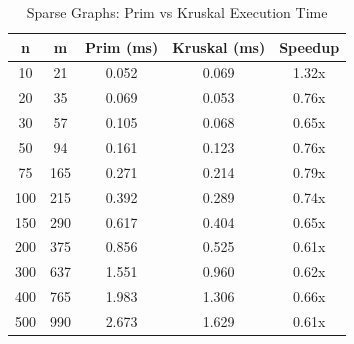 \begin{table}[H]
    \centering
    \small
    \begin{tabular}{|c|c|c|c|c|}
    \hline
    \textbf{n} & \textbf{m} & \textbf{Prim (ms)} & \textbf{Kruskal (ms)} & \textbf{Speedup} \\
    \hline
     10 &    21 &   0.052 &   0.069 &  1.32x \\
     20 &    35 &   0.069 &   0.053 &  0.76x \\
     30 &    57 &   0.105 &   0.068 &  0.65x \\
     50 &    94 &   0.161 &   0.123 &  0.76x \\
     75 &   165 &   0.271 &   0.214 &  0.79x \\
    100 &   215 &   0.392 &   0.289 &  0.74x \\
    150 &   290 &   0.617 &   0.404 &  0.65x \\
    200 &   375 &   0.856 &   0.525 &  0.61x \\
    300 &   637 &   1.551 &   0.960 &  0.62x \\
    400 &   765 &   1.983 &   1.306 &  0.66x \\
    500 &   990 &   2.673 &   1.629 &  0.61x \\
    \hline
    \end{tabular}
    \caption{Sparse Graphs: Prim vs Kruskal Execution Time}
    \label{tab:sparse_comparison}
\end{table}